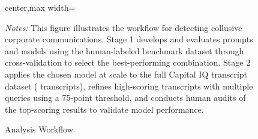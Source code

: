\begin{figure}[p]
\begin{adjustbox}{center,max width=\textwidth}
\end{adjustbox}
\caption{Analysis Workflow}
\label{fig:workflow_two_column_scaled}
\begin{minipage}{\textwidth}
    \vspace{1em}
    \footnotesize
    \textit{Notes:} This figure illustrates the workflow for detecting collusive corporate communications. Stage 1 develops and evaluates prompts and models using the human-labeled benchmark dataset through cross-validation to select the best-performing combination. Stage 2 applies the chosen model at scale to the full Capital IQ transcript dataset ( transcripts), refines high-scoring transcripts with multiple queries using a 75-point threshold, and conducts human audits of the top-scoring results to validate model performance.
\end{minipage}
\end{figure}
